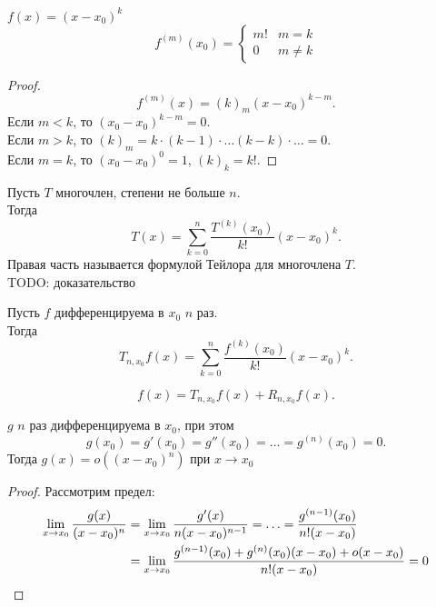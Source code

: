 \documentclass[11pt, oneside]{article}   	%
\begin{document}
    \begin{tlemma}
        $f(x) = (x-x_0)^{k}$
        \begin{equation*}
            f^{(m)}(x_0) = \begin{cases}
                m! & m = k\\
                0 & m \neq k
            \end{cases}
        \end{equation*}
        \begin{proof}
            \[ f^{(m)}(x) = (k)_{m}(x-x_0)^{k-m} .\]
            Если $m<k$, то $(x_0-x_0)^{k-m} = 0$.\\
            Если $m>k$, то $(k)_m = k\cdot (k-1) \cdot \ldots (k-k) \cdot \ldots = 0$.\\
            Если $m=k$, то $(x_0-x_0)^{0} = 1$, $(k)_{k} = k!$.
        \end{proof}
    \end{tlemma}
    \begin{theorem}
        Пусть $T$ многочлен, степени не больше $n$.\\
        Тогда
        \[ T(x) = \sum\limits_{k=0}^{n} \frac{T^{(k)}(x_0)}{k!}(x-x_0)^{k} .\]
        Правая часть называется формулой Тейлора для многочлена $T$.\\
        TODO: доказательство
    \end{theorem}
    \begin{definition}
        Пусть $f$ дифференцируема в $x_0$ $n$ раз.\\
        Тогда
        \[ T_{n, x_0}f(x) = \sum\limits_{k=0}^{n} \frac{f^{(k)}(x_0)}{k!}(x-x_0)^{k} .\] 
    \end{definition}
    \begin{definition}
        \[ f(x) = T_{n, x_0}f(x) + R_{n, x_0} f(x) .\] 
    \end{definition}
    \begin{dlemma}
        $g$  $n$ раз дифференцируема в $x_0$, при этом
        \[ g(x_0) = g'(x_0) = g''(x_0) = \ldots = g^{(n)}(x_0) = 0 .\]
        Тогда $g(x) = o\left( (x-x_0)^{n} \right) $ при $x \to x_0$
        \begin{proof}
            Рассмотрим предел:
            \begin{equation*}
                \begin{split}
                    \lim\limits_{x \to x_0} \frac{g(x)}{(x-x_0)^{n}} &= \lim\limits_{x \to x_0} \frac{g'(x)}{n(x-x_0)^{n-1}} = \ldots = \frac{g^{(n-1)}(x_0)}{n!(x-x_0)}\\
                    &= \lim\limits_{x \to x_0} \frac{g^{(n-1)}(x_0) + g^{(n)}(x_0)(x-x_0) + o(x-x_0)}{n!(x-x_0)} = 0 \qedhere
                \end{split}
            \end{equation*}
        \end{proof}
    \end{dlemma}
\end{document}
